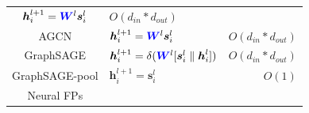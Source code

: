 \begin{table}
\begin{footnotesize}
\begin{tabular}{cp{20em}r}
			$\boldsymbol{h}_i^{l+1} = \textcolor{blue}{\boldsymbol{W}}^l  \boldsymbol{s}_i^{l}$                                                                                                                              &
			$O(d_{in} * d_{out})$                                                                                                                                                                                              \\
			AGCN                                                                                                                                                                                                             &
			$\boldsymbol{h}_i^{l+1} = \textcolor{blue}{\boldsymbol{W}}^l  \boldsymbol{s}_i^{l}$                                                                                                                              &
			$O(d_{in} * d_{out})$                                                                                                                                                                                              \\
			GraphSAGE                                                                                                                                                                                                        &
			$\boldsymbol{h}_i^{l+1} =   \delta(\textcolor{blue}{\boldsymbol{W}}^l  [\boldsymbol{s}_i^{l} \parallel \boldsymbol{h}_i^l])$                                                                                     &
			$O(d_{in} * d_{out})$                                                                                                                                                                                              \\
			GraphSAGE-pool                                                                                                                                                                                                   &
			$\boldsymbol{h}_i^{l+1} = \boldsymbol{s}_i^l$                                                                                                                                                                    &
			$O(1)$                                                                                                                                                                                                             \\
			Neural FPs                                                                                                                                                                                                       &

\end{tabular}
\end{footnotesize}
\end{table}
